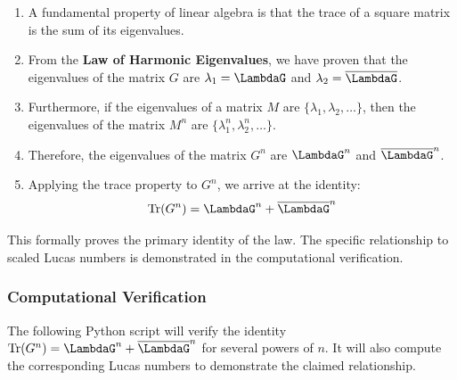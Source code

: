 \begin{enumerate}
    \item A fundamental property of linear algebra is that the trace of a square matrix is the sum of its eigenvalues.
    \item From the \textbf{Law of Harmonic Eigenvalues}, we have proven that the eigenvalues of the matrix $G$ are $\lambda_1 = \LambdaG$ and $\lambda_2 = \overline{\LambdaG}$.
    \item Furthermore, if the eigenvalues of a matrix $M$ are $\{\lambda_1, \lambda_2, \dots\}$, then the eigenvalues of the matrix $M^n$ are $\{\lambda_1^n, \lambda_2^n, \dots\}$.
    \item Therefore, the eigenvalues of the matrix $G^n$ are $\LambdaG^n$ and $\overline{\LambdaG}^n$.
    \item Applying the trace property to $G^n$, we arrive at the identity:
    $$ \text{Tr}(G^n) = \LambdaG^n + \overline{\LambdaG}^n $$
\end{enumerate}
This formally proves the primary identity of the law. The specific relationship to scaled Lucas numbers is demonstrated in the computational verification.

\subsubsection*{Computational Verification}
The following Python script will verify the identity $\text{Tr}(G^n) = \LambdaG^n + \overline{\LambdaG}^n$ for several powers of $n$. It will also compute the corresponding Lucas numbers to demonstrate the claimed relationship.

